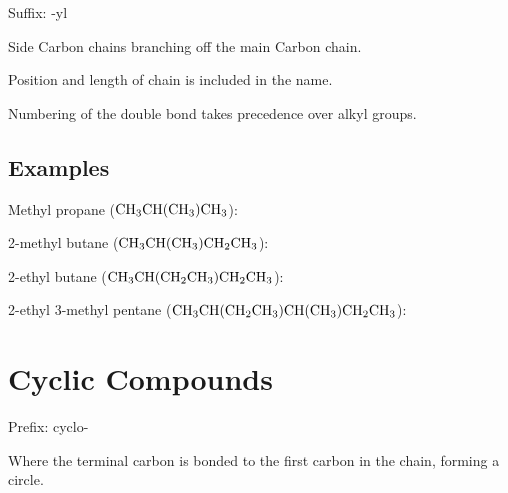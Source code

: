 \documentclass[a4paper,11pt]{article}
\begin{document}
Suffix: -yl

Side Carbon chains branching off the main Carbon chain.

Position and length of chain is included in the name.

Numbering of the double bond takes precedence over alkyl groups.


\subsection{Examples}

Methyl propane ($\ce{CH3CH(CH3)CH3}$):

\begin{center}
\end{center}

2-methyl butane ($\ce{CH3CH(CH3)CH2CH3}$):

\begin{center}
\end{center}

2-ethyl butane ($\ce{CH3CH(CH2CH3)CH2CH3}$):

\begin{center}
\end{center}

2-ethyl 3-methyl pentane ($\ce{CH3CH(CH2CH3)CH(CH3)CH2CH3}$):

\begin{center}
\end{center}




\section{Cyclic Compounds}

Prefix: cyclo-

Where the terminal carbon is bonded to the first carbon in the chain, forming a
circle.
\end{document}
